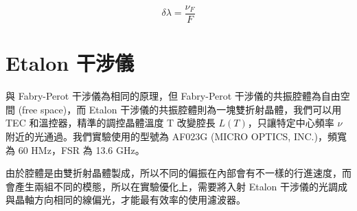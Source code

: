 \documentclass[class=NCU_thesis, crop=false]{standalone}
\begin{document}

\begin{equation}
    \delta \lambda=\frac{\nu_{F}}{F}
    \label{eq:resolution}
\end{equation}


\section{Etalon 干涉儀}
與 Fabry-Perot 干涉儀為相同的原理，但 Fabry-Perot 干涉儀的共振腔體為自由空間 (free space)，而 Etalon 干涉儀的共振腔體則為一塊雙折射晶體，我們可以用 TEC 和溫控器，精準的調控晶體溫度 T 改變腔長 $L(T)$，只讓特定中心頻率 $\nu$ 附近的光通過。我們實驗使用的型號為 AF023G (MICRO OPTICS, INC.)，頻寬為 60 HMz，FSR 為 13.6 GHz。

由於腔體是由雙折射晶體製成，所以不同的偏振在內部會有不一樣的行進速度，而會產生兩組不同的模態，所以在實驗優化上，需要將入射 Etalon 干涉儀的光調成與晶軸方向相同的線偏光，才能最有效率的使用濾波器。
\end{document}
